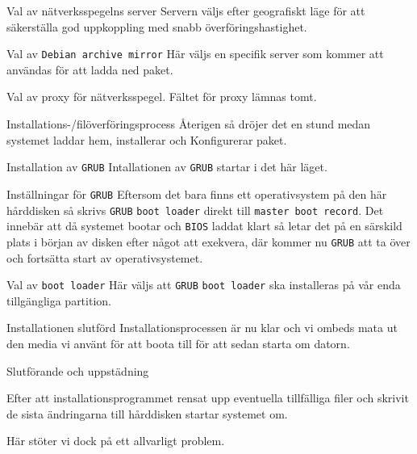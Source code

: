            {Val av nätverksspegelns server}
           {Servern väljs efter geografiskt läge för att säkerställa god
            uppkoppling med snabb överföringshastighet.}
           {}

           {Val av \texttt{Debian archive mirror}}
           {Här väljs en specifik server som kommer att användas för att
            ladda ned paket.}
           {}

           {Val av proxy för nätverksspegel.}
           {Fältet för proxy lämnas tomt.}
           {}

           {Installations-/filöverföringsprocess}
           {Återigen så dröjer det en stund medan systemet laddar hem,
            installerar och Konfigurerar paket.}
           {}

           {Installation av \texttt{GRUB}}
           {Intallationen av \texttt{GRUB} startar i det här läget.}
           {}

           {Inställningar för \texttt{GRUB}}
           {Eftersom det bara finns ett operativsystem på den här hårddisken så
            skrivs \texttt{GRUB} \texttt{boot loader} direkt till
            \texttt{master boot record}.
            Det innebär att då systemet bootar och \texttt{BIOS} laddat klart
            så letar det på en särskild plats i början av disken efter något
            att exekvera, där kommer nu \texttt{GRUB} att ta över och fortsätta
            start av operativsystemet.}
           {}

           {Val av \texttt{boot loader}}
           {Här väljs att \texttt{GRUB} \texttt{boot loader} ska installeras
            på vår enda tillgängliga partition.}
           {}

           {Installationen slutförd}
           {Installationsprocessen är nu klar och vi ombeds mata ut den media
            vi använt för att boota till för att sedan starta om datorn.}
           {}

           {Slutförande och uppstädning}
           {Efter att installationsprogrammet rensat upp eventuella tillfälliga filer
            och skrivit de sista ändringarna till hårddisken startar systemet om.
            \par Här stöter vi dock på ett allvarligt problem.}
           {}


